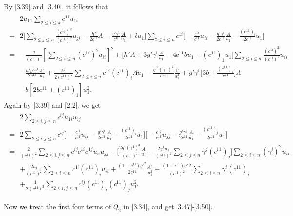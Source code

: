 \documentclass[11pt]{amsart}
\numberwithin{equation}{section}
\begin{document}
By \eqref{3.39}  and \eqref{3.40},  it follows that
\begin{align}\label{3.45}
\begin{split}
&2u_{11}\sum_{2\leq i\leq n}c^{1i}u_{1i}\\=&2\big[\sum_{2\leq j\leq n}\frac{(c^{1j})^2}{(c^{11})^2}u_{jj}-\frac{h'}{2c^{11}} A-\frac{g'\gamma^1}{c^{11}}\frac{A}{u_1}+bu_1\big]\sum_{2\leq i\leq n}c^{1i}\big[-\frac{c^{1i}}{c^{11}}u_{ii}-\frac{g'\gamma^i}{2c^{11}}\frac{A}{u_1}-\frac{(c^{11})_i}{2c^{11}} u_1\big]\\
=&-\frac{2}{(c^{11})^3}[\sum_{2\leq i\leq n}(c^{1i})^2u_{ii}]^2+\big[h'A+3g'\gamma^1\frac{A}{u_1}-4c^{11}bu_1-(c^{11})_1u_1\big]\sum_{2\leq i\leq n}\frac{(c^{1i})^2}{(c^{11})^2}u_{ii}\\&-\frac{h'g'\gamma^1}{2c^{11}}\frac{A^2}{u_1}+\frac{h'}{2(c^{11})^2}\sum_{2\leq i\leq n}c^{1i}(c^{11})_i Au_1-\frac{g'^2(\gamma^1)^2}{c^{11}}\frac{A^2}{u_1^2}+g'\gamma^1\big[3b+\frac{(c^{11})_1}{c^{11}}\big]A\\&-b[2bc^{11}+(c^{11})_1]u^2_1.
\end{split}
\end{align}
Again by \eqref{3.39}  and \eqref{2.2},  we get
\begin{align}\label{3.46}
\begin{split}
&2\sum_{2\leq i,j\leq n}c^{ij}u_{1i}u_{1j}\\
=&2\sum_{2\leq i,j\leq n}c^{ij}\big[-\frac{c^{1i}}{c^{11}}u_{ii}-\frac{g'\gamma^i}{2c^{11}}\frac{A}{u_1}-\frac{(c^{11})_i}{2c^{11}} u_1\big]\big[-\frac{c^{1j}}{c^{11}}u_{jj}-\frac{g'\gamma^j}{2c^{11}}\frac{A}{u_1}-\frac{(c^{11})_j}{2c^{11}} u_1\big]\\
=&\frac{2}{(c^{11})^2}\sum_{2\leq i,j\leq n}c^{ij}c^{1i}c^{1j}u_{ii}u_{jj}-\big[\frac{2g'(\gamma^1)^3}{(c^{11})^2}\frac{A}{u_1}-\frac{2\gamma^1u_1}{(c^{11})^2}\sum_{2\leq j\leq n}\gamma^j(c^{11})_j\big]\sum_{2\leq i\leq n}(\gamma^i)^2u_{ii}\\&+\frac{2u_1}{(c^{11})^2}\sum_{2\leq i\leq n}c^{1i}(c^{11})_iu_{ii} +\frac{(1-c^{11})g'^2}{2c^{11}}\frac{A^2}{u_1^2}
+\frac{(1-c^{11})g'A}{(c^{11})^2 }\sum_{2\leq i\leq n}\gamma^i(c^{11})_i \\&+\frac{1}{2(c^{11})^2}\sum_{2\leq i,j\leq n}c^{ij}(c^{11})_i(c^{11})_j u_1^2.
\end{split}
\end{align}


Now we  treat  the first four terms of $Q_2$ in \eqref{3.34}, and get \eqref{3.47}-\eqref{3.50}.
\end{document}

